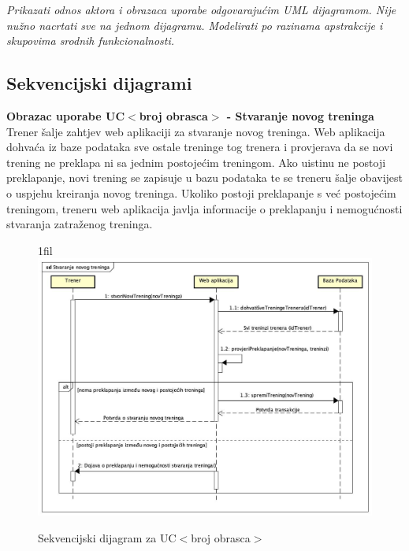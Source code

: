 					\textit{Prikazati odnos aktora i obrazaca uporabe odgovarajućim UML dijagramom. Nije nužno nacrtati sve na jednom dijagramu. Modelirati po razinama apstrakcije i skupovima srodnih funkcionalnosti.}
				\eject		
				
								\makeatletter
                                                                        \newcommand*{\centerfloat}{%
                                                                          \parindent \z@
                                                                          \leftskip \z@ \@plus 1fil \@minus \textwidth
                                                                          \rightskip\leftskip
                                                                          \parfillskip \z@skip}
                                                                   \makeatother
				
				
			\subsection{Sekvencijski dijagrami}
			
			
				\textbf{Obrazac uporabe UC$<$broj obrasca$>$ - Stvaranje novog treninga}\\
				Trener šalje zahtjev web aplikaciji za stvaranje novog treninga. Web aplikacija dohvaća iz baze podataka sve ostale treninge tog trenera i provjerava da se novi trening ne preklapa ni sa jednim postojećim treningom. Ako uistinu ne postoji preklapanje, novi trening se zapisuje u bazu podataka te se treneru šalje obavijest o uspjehu kreiranja novog treninga. Ukoliko postoji preklapanje s već postojećim treningom, treneru web aplikacija javlja informacije o preklapanju i nemogućnosti stvaranja zatraženog treninga.
				\eject
				
				\begin{figure}[H]
					\centerfloat
        					\includegraphics[scale=0.48]{dijagrami/StvaranjeNovogTreninga.jpg} %
        					\caption{Sekvencijski dijagram za UC$<$broj obrasca$>$}
        					\label{fig:UC$<$broj obrasca$>$}
				\end{figure}
				
